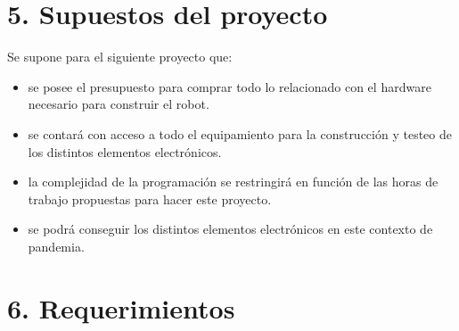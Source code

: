 \documentclass[
11pt, %
codirector, %
]{charter}
\begin{document}
\section{5. Supuestos del proyecto}
\label{sec:supuestos}

Se supone para el siguiente proyecto que:
\begin{itemize}
\item se posee el presupuesto para comprar todo lo relacionado con el hardware necesario para construir el robot. 
\item se contará con acceso a todo el equipamiento para la construcción y testeo de los distintos elementos electrónicos.
\item la complejidad de la programación se restringirá en función de las horas de trabajo propuestas para hacer este proyecto.
\item se podrá conseguir los distintos elementos electrónicos en este contexto de pandemia.
\end{itemize}

\section{6. Requerimientos}
\label{sec:requerimientos}
\end{document}
